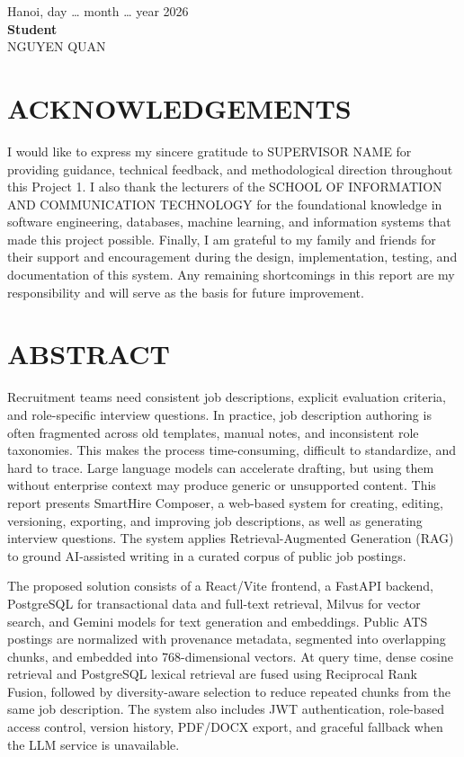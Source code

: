 \documentclass[12pt,a4paper,oneside]{report}
\newcommand{\School}{SCHOOL OF INFORMATION AND COMMUNICATION TECHNOLOGY}
\newcommand{\ProjectName}{SmartHire Composer}
\newcommand{\StudentName}{NGUYEN QUAN}
\newcommand{\Supervisor}{SUPERVISOR NAME}
\begin{document}
\vspace{1cm}
\begin{flushright}
Hanoi, day \ldots{} month \ldots{} year 2026\\[1.8cm]
\textbf{Student}\\[1.5cm]
\StudentName
\end{flushright}

\chapter*{ACKNOWLEDGEMENTS}
I would like to express my sincere gratitude to \Supervisor{} for providing guidance, technical feedback, and methodological direction throughout this Project 1. I also thank the lecturers of the \School{} for the foundational knowledge in software engineering, databases, machine learning, and information systems that made this project possible. Finally, I am grateful to my family and friends for their support and encouragement during the design, implementation, testing, and documentation of this system. Any remaining shortcomings in this report are my responsibility and will serve as the basis for future improvement.

\chapter*{ABSTRACT}
Recruitment teams need consistent job descriptions, explicit evaluation criteria, and role-specific interview questions. In practice, job description authoring is often fragmented across old templates, manual notes, and inconsistent role taxonomies. This makes the process time-consuming, difficult to standardize, and hard to trace. Large language models can accelerate drafting, but using them without enterprise context may produce generic or unsupported content. This report presents \ProjectName, a web-based system for creating, editing, versioning, exporting, and improving job descriptions, as well as generating interview questions. The system applies Retrieval-Augmented Generation (RAG) to ground AI-assisted writing in a curated corpus of public job postings.

The proposed solution consists of a React/Vite frontend, a FastAPI backend, PostgreSQL for transactional data and full-text retrieval, Milvus for vector search, and Gemini models for text generation and embeddings. Public ATS postings are normalized with provenance metadata, segmented into overlapping chunks, and embedded into 768-dimensional vectors. At query time, dense cosine retrieval and PostgreSQL lexical retrieval are fused using Reciprocal Rank Fusion, followed by diversity-aware selection to reduce repeated chunks from the same job description. The system also includes JWT authentication, role-based access control, version history, PDF/DOCX export, and graceful fallback when the LLM service is unavailable.
\end{document}
